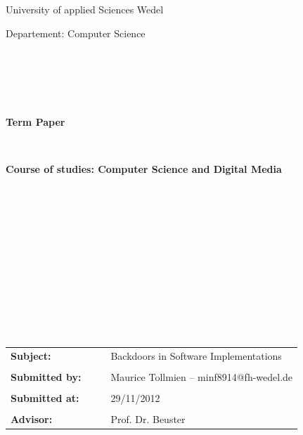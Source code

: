 \documentclass[a4paper, 12pt]{article}
\begin{document}

\begin{center}
\Large{University of applied Sciences Wedel}
\end{center}

\begin{center}
\Large{Departement: Computer Science}
\end{center}

\begin{verbatim}





\end{verbatim}

\begin{center}
\textbf{\LARGE{Term Paper}}
\end{center}

\begin{verbatim}


\end{verbatim}

\begin{center}
\textbf{\large{Course of studies: Computer Science and Digital Media}}
\end{center}

\begin{verbatim}












\end{verbatim}

\begin{flushleft}
\begin{tabular}{llll}

\textbf{Subject:}
& & & Backdoors in Software Implementations
\\
\\
\textbf{Submitted by:}
& & & Maurice Tollmien -- minf8914@fh-wedel.de
\\
\\
\textbf{Submitted at:}
& & & 29/11/2012
\\
\\
\textbf{Advisor:}
& & & Prof. Dr. Beuster



\end{tabular}
\end{flushleft}
\end{document}

